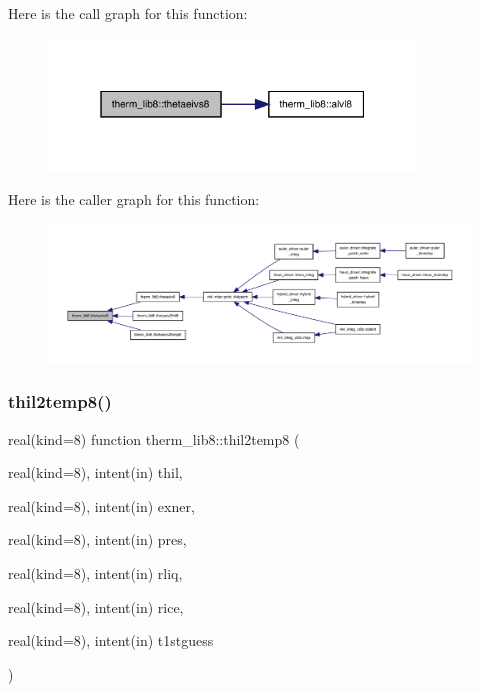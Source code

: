 Here is the call graph for this function\+:
\nopagebreak
\begin{figure}[H]
\begin{center}
\leavevmode
\includegraphics[width=277pt]{namespacetherm__lib8_a43786e4d4bcf61f6d8fb66fa5a925df9_cgraph}
\end{center}
\end{figure}
Here is the caller graph for this function\+:
\nopagebreak
\begin{figure}[H]
\begin{center}
\leavevmode
\includegraphics[width=350pt]{namespacetherm__lib8_a43786e4d4bcf61f6d8fb66fa5a925df9_icgraph}
\end{center}
\end{figure}
\mbox{\label{namespacetherm__lib8_a7d009d0d3507e656b58c9eb70c747598}} 
\subsubsection{\texorpdfstring{thil2temp8()}{thil2temp8()}}
{\footnotesize\ttfamily real(kind=8) function therm\+\_\+lib8\+::thil2temp8 (\begin{DoxyParamCaption}\item[{real(kind=8), intent(in)}]{thil,  }\item[{real(kind=8), intent(in)}]{exner,  }\item[{real(kind=8), intent(in)}]{pres,  }\item[{real(kind=8), intent(in)}]{rliq,  }\item[{real(kind=8), intent(in)}]{rice,  }\item[{real(kind=8), intent(in)}]{t1stguess }\end{DoxyParamCaption})}

